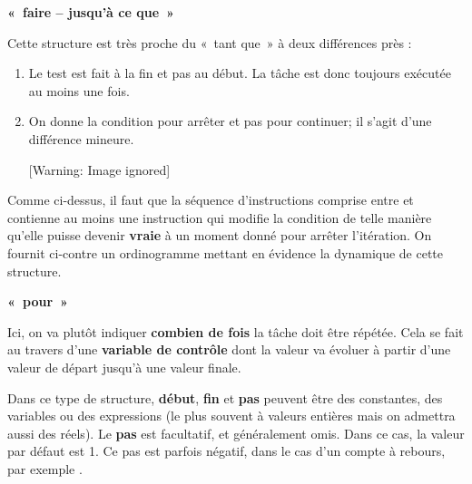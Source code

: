 {\sffamily\bfseries\upshape
«~faire – jusqu'à ce que~»}

{
Cette structure est très proche du «~tant que~» à deux différences près
:}

\liststyleNumberingi
\begin{enumerate}
\item {
Le test est fait à la fin et pas au début. La tâche est donc toujours
exécutée au moins une fois. }
\item {
On donne la condition pour arrêter et pas pour continuer; il
s'agit d'une différence mineure.}
\begin{center}
 [Warning: Image ignored] %

\end{center}
\end{enumerate}

\bigskip



\bigskip

{
Comme ci-dessus, il faut que la séquence d’instructions comprise entre
 et  contienne au moins une instruction qui modifie la condition de
telle manière qu’elle puisse devenir \textbf{vraie} à un moment donné
pour arrêter l'itération. On fournit ci-contre un
ordinogramme mettant en évidence la dynamique de cette structure.}

{\sffamily\bfseries
«~pour~»}

{
Ici, on va plutôt indiquer \textbf{combien de fois} la tâche doit être
répétée. Cela se fait au travers d'une
\textbf{variable de contrôle} dont la valeur va évoluer à partir
d'une valeur de départ jusqu'à une
valeur finale.}


\bigskip

{
Dans ce type de structure, \textbf{début}, \textbf{fin} et \textbf{pas}
peuvent être des constantes, des variables ou des expressions (le plus
souvent à valeurs entières mais on admettra aussi des réels). Le
\textbf{pas} est facultatif, et généralement omis. Dans ce cas, la
valeur par défaut est 1. Ce pas est parfois négatif, dans le cas
d'un compte à rebours, par exemple
.}

